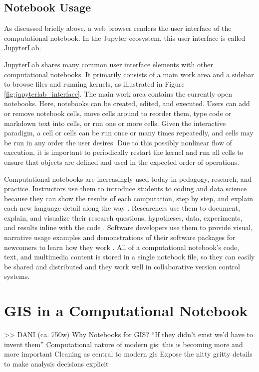 \documentclass[11pt,letterpaper]{article}
\begin{document}
\subsection{Notebook Usage}

As discussed briefly above, a web browser renders the user interface of the computational notebook. In the Jupyter ecosystem, this user interface is called JupyterLab.

JupyterLab shares many common user interface elements with other computational notebooks. It primarily consists of a main work area and a sidebar to browse files and running kernels, as illustrated in Figure \ref{fig:jupyterlab_interface}. The main work area contains the currently open notebooks. Here, notebooks can be created, edited, and executed. Users can add or remove notebook cells, move cells around to reorder them, type code or markdown text into cells, or run one or more cells. Given the interactive paradigm, a cell or cells can be run once or many times repeatedly, and cells may be run in any order the user desires. Due to this possibly nonlinear flow of execution, it is important to periodically restart the kernel and run all cells to ensure that objects are defined and used in the expected order of operations.

Computational notebooks are increasingly used today in pedagogy, research, and practice. Instructors use them to introduce students to coding and data science because they can show the results of each computation, step by step, and explain each new language detail along the way \citep{reades_teaching_2020}. Researchers use them to document, explain, and visualize their research questions, hypotheses, data, experiments, and results inline with the code \citep{perkel_why_2018}. Software developers use them to provide visual, narrative usage examples and demonstrations of their software packages for newcomers to learn how they work \citep{boeing_urban_2020}. All of a computational notebook's code, text, and multimedia content is stored in a single notebook file, so they can easily be shared and distributed and they work well in collaborative version control systems.

\section{GIS in a Computational Notebook}

>> DANI
(ca. 750w)
Why Notebooks for GIS?
\enquote{If they didn't exist we'd have to invent them}
Computational nature of modern gis: this is becoming more and more important
Cleaning as central to modern gis
Expose the nitty gritty details to make analysis decisions explicit
\end{document}
